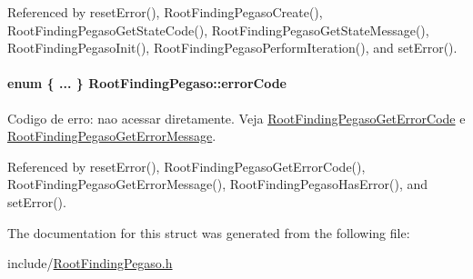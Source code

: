 Referenced by resetError(), RootFindingPegasoCreate(), RootFindingPegasoGetStateCode(), RootFindingPegasoGetStateMessage(), RootFindingPegasoInit(), RootFindingPegasoPerformIteration(), and setError().\hypertarget{structRootFindingPegaso_0b6d561b18770d1e472e1f69c143ee96}{
\paragraph[errorCode]{\setlength{\rightskip}{0pt plus 5cm}enum \{ ... \}   {\bf RootFindingPegaso::errorCode}}\hfill}
\label{structRootFindingPegaso_0b6d561b18770d1e472e1f69c143ee96}


Codigo de erro: nao acessar diretamente. Veja \hyperlink{group____pegaso_g6b27d39dab4f225185c07eb6fbb22ff9}{RootFindingPegasoGetErrorCode} e \hyperlink{group____pegaso_g4d0abd516b71e0462de1b22ce896b87a}{RootFindingPegasoGetErrorMessage}. 



Referenced by resetError(), RootFindingPegasoGetErrorCode(), RootFindingPegasoGetErrorMessage(), RootFindingPegasoHasError(), and setError().

The documentation for this struct was generated from the following file:\begin{CompactItemize}
\item 
include/\hyperlink{RootFindingPegaso_8h}{RootFindingPegaso.h}\end{CompactItemize}

